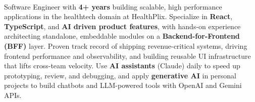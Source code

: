 \\
Software Engineer with \textbf{4+ years} building scalable, high performance applications in the healthtech domain at HealthPlix. 
Specialize in \textbf{React}, \textbf{TypeScript}, and \textbf{AI driven product features}, 
with hands-on experience architecting standalone, embeddable modules on a \textbf{Backend-for-Frontend (BFF)} layer. 
Proven track record of shipping revenue-critical systems, driving frontend performance and observability, and building reusable UI infrastructure that lifts cross-team velocity. 
Use \textbf{AI assistants} (Claude) daily to speed up prototyping, review, and debugging, and apply \textbf{generative AI} in personal projects to build chatbots and LLM-powered tools with OpenAI and Gemini APIs.